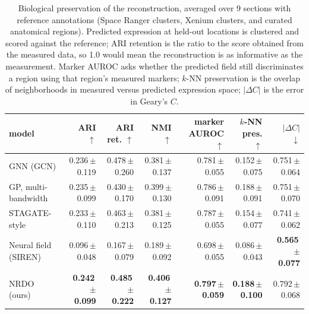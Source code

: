 \begin{table}[htbp]
\centering
\footnotesize
\setlength{\tabcolsep}{3pt}
\caption{Biological preservation of the reconstruction, averaged over 9 sections with reference annotations (Space Ranger clusters, Xenium clusters, and curated anatomical regions). Predicted expression at held-out locations is clustered and scored against the reference; ARI retention is the ratio to the score obtained from the measured data, so 1.0 would mean the reconstruction is as informative as the measurement. Marker AUROC asks whether the predicted field still discriminates a region using that region's measured markers; $k$-NN preservation is the overlap of neighborhoods in measured versus predicted expression space; $|\Delta C|$ is the error in Geary's $C$.}
\label{tab:biology}
\begin{tabular}{lrrrrrr}
\toprule
model & ARI $\uparrow$ & ARI ret. $\uparrow$ & NMI $\uparrow$ & marker AUROC $\uparrow$ & $k$-NN pres. $\uparrow$ & $|\Delta C|$ $\downarrow$\\
\midrule
GNN (GCN) & 0.236\,\tiny{$\pm$ 0.119} & 0.478\,\tiny{$\pm$ 0.260} & 0.381\,\tiny{$\pm$ 0.137} & 0.781\,\tiny{$\pm$ 0.055} & 0.152\,\tiny{$\pm$ 0.075} & 0.751\,\tiny{$\pm$ 0.064} \\
GP, multi-bandwidth & 0.235\,\tiny{$\pm$ 0.099} & 0.430\,\tiny{$\pm$ 0.170} & 0.399\,\tiny{$\pm$ 0.130} & 0.786\,\tiny{$\pm$ 0.091} & 0.188\,\tiny{$\pm$ 0.091} & 0.751\,\tiny{$\pm$ 0.070} \\
STAGATE-style & 0.233\,\tiny{$\pm$ 0.110} & 0.463\,\tiny{$\pm$ 0.213} & 0.381\,\tiny{$\pm$ 0.125} & 0.787\,\tiny{$\pm$ 0.055} & 0.154\,\tiny{$\pm$ 0.077} & 0.741\,\tiny{$\pm$ 0.062} \\
Neural field (SIREN) & 0.096\,\tiny{$\pm$ 0.048} & 0.167\,\tiny{$\pm$ 0.079} & 0.189\,\tiny{$\pm$ 0.092} & 0.698\,\tiny{$\pm$ 0.055} & 0.086\,\tiny{$\pm$ 0.043} & \textbf{0.565\,\tiny{$\pm$ 0.077}} \\
\midrule
NRDO (ours) & \textbf{0.242\,\tiny{$\pm$ 0.099}} & \textbf{0.485\,\tiny{$\pm$ 0.222}} & \textbf{0.406\,\tiny{$\pm$ 0.127}} & \textbf{0.797\,\tiny{$\pm$ 0.059}} & \textbf{0.188\,\tiny{$\pm$ 0.100}} & 0.792\,\tiny{$\pm$ 0.068} \\
\bottomrule
\end{tabular}
\end{table}

